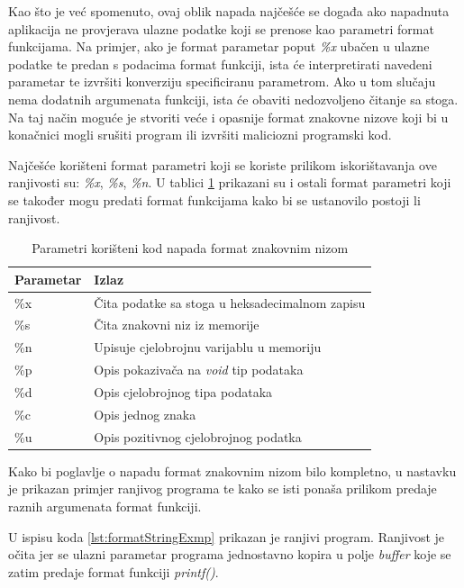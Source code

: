 \documentclass[times, utf8, diplomski, numeric]{fer}
\begin{document}
Kao što je već spomenuto, ovaj oblik napada najčešće se događa
ako napadnuta aplikacija ne provjerava ulazne podatke koji se
prenose kao parametri format funkcijama. Na primjer, ako je
format parametar poput \emph{\%x} ubačen u ulazne podatke te
predan s podacima format funkciji, ista će interpretirati
navedeni parametar te izvršiti konverziju specificiranu
parametrom. Ako u tom slučaju nema dodatnih argumenata funkciji,
ista će obaviti nedozvoljeno čitanje sa stoga. Na taj način
moguće je stvoriti veće i opasnije format znakovne nizove koji bi
u konačnici mogli srušiti program ili izvršiti maliciozni programski kod.				%

Najčešće korišteni format parametri koji se koriste prilikom				%
iskorištavanja ove ranjivosti su: \emph{\%x}, \emph{\%s}, \emph{\%n}.
U tablici \ref{tbl:format_parameters} prikazani su i ostali
format parametri koji se također mogu predati format funkcijama
kako bi se ustanovilo postoji li ranjivost.

\begin{table}[htb]
\small
\caption{Parametri korišteni kod napada format znakovnim nizom}
\label{tbl:format_parameters}
\centering
\begin{tabular}{|l|p{8cm}|}
\hline
Parametar & Izlaz \\ \hline
\%x & Čita podatke sa stoga u heksadecimalnom zapisu \\ \hline
\%s & Čita znakovni niz iz memorije \\ \hline
\%n & Upisuje cjelobrojnu varijablu u memoriju \\ \hline
\%p & Opis pokazivača na \emph{void} tip podataka \\ \hline
\%d & Opis cjelobrojnog tipa podataka \\ \hline
\%c & Opis jednog znaka \\ \hline
\%u & Opis pozitivnog cjelobrojnog podatka \\ \hline
\end{tabular}
\end{table}

Kako bi poglavlje o napadu format znakovnim nizom bilo kompletno,
u nastavku je prikazan primjer ranjivog programa te kako se isti
ponaša prilikom predaje raznih argumenata format funkciji.

U ispisu koda \ref{lst:formatStringExmp} prikazan je ranjivi
program. Ranjivost je očita jer se ulazni parametar programa
jednostavno kopira u polje \emph{buffer} koje se zatim predaje
format funkciji \emph{printf()}. 
\end{document}
